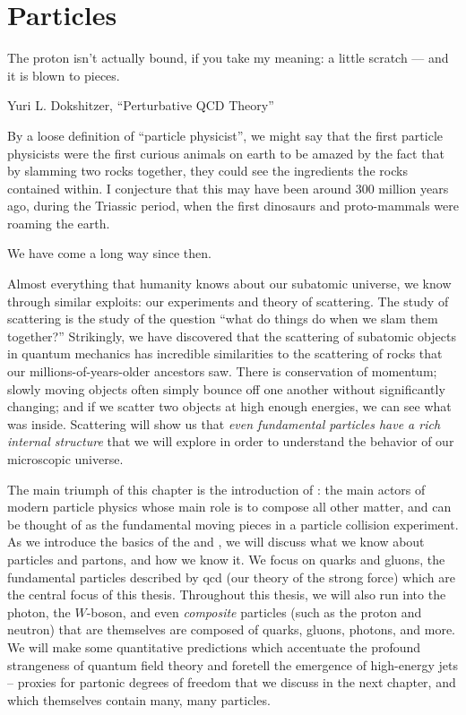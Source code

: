 \chapter[Particles]{Particles}

\label{chap:particles}


\epigraph{The proton isn’t actually bound, if you take my meaning: a little scratch — and it is blown to pieces.}{Yuri L. Dokshitzer, ``Perturbative QCD Theory'' \cite{Dokshitzer:1998nz}}

By a loose definition of ``particle physicist'', we might say that the first particle physicists were the first curious animals on earth to be amazed by the fact that by slamming two rocks together, they could see the ingredients the rocks contained within.
%
I conjecture that this may have been around 300 million years ago, during the Triassic period, when the first dinosaurs and proto-mammals were roaming the earth.


We have come a long way since then.


Almost everything that humanity knows about our subatomic universe, we know through similar exploits:
%
our experiments and theory of scattering.
%
The study of scattering is the study of the question ``what do things do when we slam them together?''
%
Strikingly, we have discovered that the scattering of subatomic objects in quantum mechanics has incredible similarities to the scattering of rocks that our millions-of-years-older ancestors saw.
%
There is conservation of momentum;
%
slowly moving objects often simply bounce off one another without significantly changing;
%
and if we scatter two objects at high enough energies, we can see what was inside.
%
Scattering will show us that \emph{even \textit{fundamental} particles have a rich internal structure} that we will explore in order to understand the behavior of our microscopic universe.


The main triumph of this chapter is the introduction of :
%
the main actors of modern particle physics whose main role is to compose all other matter, and can be thought of as the fundamental moving pieces in a particle collision experiment.
%
As we introduce the basics of the  and , we will discuss what we know about particles and partons, and how we know it.
%
We focus on quarks and gluons, the fundamental particles described by \gls{qcd} (our theory of the strong force) which are the central focus of this thesis.
%
Throughout this thesis, we will also run into the photon, the \(W\)-boson, and even \textit{composite} particles (such as the proton and neutron) that are themselves are composed of quarks, gluons, photons, and more.
%
We will make some quantitative predictions which accentuate the profound strangeness of quantum field theory and foretell the emergence of high-energy jets -- proxies for partonic degrees of freedom that we discuss in the next chapter, and which themselves contain many, many particles.

